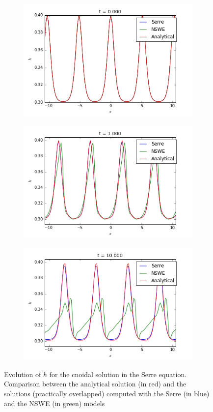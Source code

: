 \begin{figure}[h!]
	\begin{subfigure}{.3\linewidth}
		\includegraphics[scale=.3]{figures/Serre/4x4cnoidal1h.png}	
	\end{subfigure}
	\begin{subfigure}{.3\linewidth}
		\includegraphics[scale=.3]{figures/Serre/4x4cnoidal2h.png}	
	\end{subfigure}
	\begin{subfigure}{.3\linewidth}
		\includegraphics[scale=.3]{figures/Serre/4x4cnoidal3h.png}	
	\end{subfigure}
	\caption{Evolution of $h$ for the cnoidal solution in the Serre equation. Comparison between the analytical solution (in red) and the solutions (practically overlapped) computed with the Serre (in blue) and the NSWE (in green)  models \label{fig:cnoidalh}}
\end{figure}

